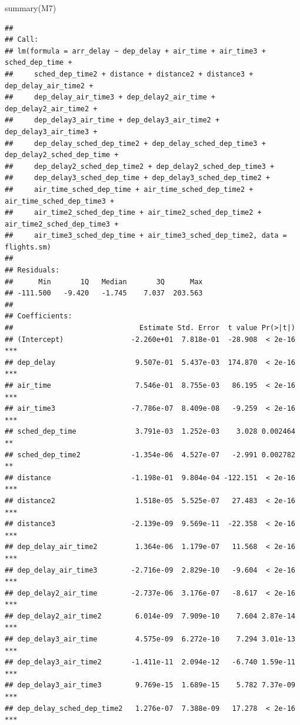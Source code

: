 \documentclass[
]{article}
\newenvironment{Shaded}{\begin{snugshade}}{\end{snugshade}}
\newcommand{\FunctionTok}[1]{\textcolor[rgb]{0.00,0.00,0.00}{#1}}
\newcommand{\NormalTok}[1]{#1}
\begin{document}
\begin{Shaded}
\begin{Highlighting}[]
\FunctionTok{summary}\NormalTok{(M7)}
\end{Highlighting}
\end{Shaded}

\begin{verbatim}
## 
## Call:
## lm(formula = arr_delay ~ dep_delay + air_time + air_time3 + sched_dep_time + 
##     sched_dep_time2 + distance + distance2 + distance3 + dep_delay_air_time2 + 
##     dep_delay_air_time3 + dep_delay2_air_time + dep_delay2_air_time2 + 
##     dep_delay3_air_time + dep_delay3_air_time2 + dep_delay3_air_time3 + 
##     dep_delay_sched_dep_time2 + dep_delay_sched_dep_time3 + dep_delay2_sched_dep_time + 
##     dep_delay2_sched_dep_time2 + dep_delay2_sched_dep_time3 + 
##     dep_delay3_sched_dep_time + dep_delay3_sched_dep_time2 + 
##     air_time_sched_dep_time + air_time_sched_dep_time2 + air_time_sched_dep_time3 + 
##     air_time2_sched_dep_time + air_time2_sched_dep_time2 + air_time2_sched_dep_time3 + 
##     air_time3_sched_dep_time + air_time3_sched_dep_time2, data = flights.sm)
## 
## Residuals:
##      Min       1Q   Median       3Q      Max 
## -111.500   -9.420   -1.745    7.037  203.563 
## 
## Coefficients:
##                              Estimate Std. Error  t value Pr(>|t|)    
## (Intercept)                -2.260e+01  7.818e-01  -28.908  < 2e-16 ***
## dep_delay                   9.507e-01  5.437e-03  174.870  < 2e-16 ***
## air_time                    7.546e-01  8.755e-03   86.195  < 2e-16 ***
## air_time3                  -7.786e-07  8.409e-08   -9.259  < 2e-16 ***
## sched_dep_time              3.791e-03  1.252e-03    3.028 0.002464 ** 
## sched_dep_time2            -1.354e-06  4.527e-07   -2.991 0.002782 ** 
## distance                   -1.198e-01  9.804e-04 -122.151  < 2e-16 ***
## distance2                   1.518e-05  5.525e-07   27.483  < 2e-16 ***
## distance3                  -2.139e-09  9.569e-11  -22.358  < 2e-16 ***
## dep_delay_air_time2         1.364e-06  1.179e-07   11.568  < 2e-16 ***
## dep_delay_air_time3        -2.716e-09  2.829e-10   -9.604  < 2e-16 ***
## dep_delay2_air_time        -2.737e-06  3.176e-07   -8.617  < 2e-16 ***
## dep_delay2_air_time2        6.014e-09  7.909e-10    7.604 2.87e-14 ***
## dep_delay3_air_time         4.575e-09  6.272e-10    7.294 3.01e-13 ***
## dep_delay3_air_time2       -1.411e-11  2.094e-12   -6.740 1.59e-11 ***
## dep_delay3_air_time3        9.769e-15  1.689e-15    5.782 7.37e-09 ***
## dep_delay_sched_dep_time2   1.276e-07  7.388e-09   17.278  < 2e-16 ***

\end{verbatim}
\end{document}
